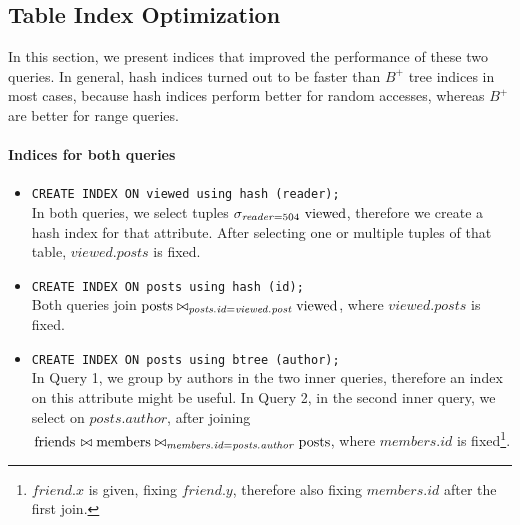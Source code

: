 \documentclass[12pt]{article}
\begin{document}
\subsection{Table Index Optimization}
In this section, we present indices that improved the performance of these two queries. In general, hash indices turned out to be faster than $\mathit{B}^+$ tree indices in most cases, because hash indices perform better for random accesses, whereas $\mathit{B}^+$ are better for range queries.

\paragraph{Indices for both queries}
\begin{itemize}
	\item \lstinline{CREATE INDEX ON viewed using hash (reader);}\\
    In both queries, we select tuples $\sigma_{\mathit{reader} = 504} \mbox{ \lstinline{viewed}}$, therefore we create a hash index for that attribute. After selecting one or multiple tuples of that table, $\mathit{viewed.posts}$ is fixed.
	\item \lstinline{CREATE INDEX ON posts using hash (id);}\\ Both queries join $\mbox{\lstinline{posts}} \bowtie_{\mathit{posts.id} = \mathit{viewed.post}} \mbox{\lstinline{viewed}}$, where $\mathit{viewed.posts}$ is fixed.
    \item \lstinline{CREATE INDEX ON posts using btree (author);} \\
    In Query 1, we group by authors in the two inner queries, therefore an index on this attribute might be useful. In Query 2, in the second inner query, we select on $\mathit{posts.author}$, after joining $\mbox{\lstinline{friends}} \bowtie \mbox{\lstinline{members}} \bowtie_{\mathit{members.id} = \mathit{posts.author}} \mbox{\lstinline{posts}}$, where $\mathit{members.id}$ is fixed\footnote{$\mathit{friend.x}$ is given, fixing $\mathit{friend.y}$, therefore also fixing $\mathit{members.id}$ after the first join.}.
\end{itemize}
\end{document}
